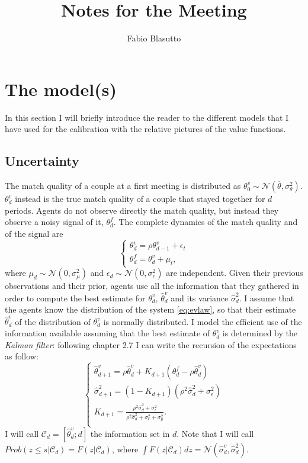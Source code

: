 \documentclass[12pt]{article}
\title{Notes for the Meeting}
\author{Fabio Blasutto}
\begin{document}
	
	\maketitle
\section{The model(s)}
In this section I will briefly introduce the reader to the different models that I have used for the calibration with the relative pictures of the value functions.
\subsection{Uncertainty}
 The match quality of a couple at a first meeting is distributed as $\theta^v_0\sim\mathcal{N}(\overline{\theta},\sigma_\theta^2)$. $\theta^v_d$ instead is the true match quality of a couple that stayed together for $d$ periods. Agents do not observe directly the match quality, but instead they observe a noisy signal of it,  $\theta^f_d$. The complete dynamics of the match quality and of the signal are
 \begin{equation}\label{eq:evlaw}
 \begin{cases}
 \theta^v_d=\rho\theta^v_{d-1}+\epsilon_t\\
 \theta^f_d=\theta^v_{d}+\mu_t,
 \end{cases}
 \end{equation}
 where $\mu_d\sim\mathcal{N}(0,\sigma_\mu^2)$ and  $\epsilon_d\sim\mathcal{N}(0,\sigma_\epsilon^2)$ are independent. Given their previous observations and their prior, agents use all the information that they gathered in order to compute the best estimate for $\theta^v_d$, $\hat{\theta}^v_d$ and its variance $\hat{\sigma}_{d}^2$. I assume that the agents know the distribution of the system \ref{eq:evlaw}, so that their estimate $\hat{\theta}^v_d$ of the distribution of $\theta^v_d$ is normally distributed. I model the efficient use of the information available assuming that the best estimate of $\theta^v_d$ is determined by the \textit{Kalman filter}: following \citet{sargent2012} chapter 2.7 I can write the recursion of the expectations as follow:
 \begin{equation}\label{eq:kalman}
 \begin{cases}
 \hat{\theta}^v_{d+1}=\rho\hat{\theta}^v_d+ K_{d+1}(\theta^f_d-\rho\hat{\theta}^v_d)\\
 \hat{\sigma}_{d+1}^2=(1-K_{d+1})(\rho^2\hat{\sigma}_{d}^2+\sigma^2_\epsilon)\\
 K_{d+1}=\frac{\rho^2\hat{\sigma}_{d}^2+\sigma^2_\epsilon}{\rho^2\hat{\sigma}_{d}^2+\sigma^2_\epsilon+\sigma_{\mu}^2}.\\
 \end{cases}
 \end{equation}
  I will call $\mathcal{C}_d=[\hat{\theta}^v_d;d]$ the information set in $d$. Note that I will call $Prob({z\leq s|\mathcal{C}_d})=F(z|\mathcal{C}_d)$, where $\int F(z|\mathcal{C}_d)dz=\mathcal{N}(\hat{\sigma}_d^v,\hat{\sigma}_{d}^2)$.
\end{document}
